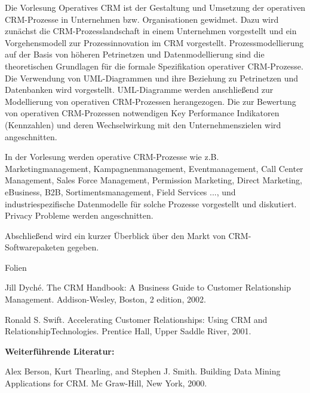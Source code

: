 \begin{course}
\begin{content}
Die Vorlesung Operatives CRM ist der Gestaltung und Umsetzung der operativen CRM-Prozesse in Unternehmen bzw. Organisationen gewidmet. Dazu wird zunächst die CRM-Prozesslandschaft in einem Unternehmen vorgestellt und ein Vorgehensmodell zur Prozessinnovation im CRM vorgestellt. Prozessmodellierung auf der Basis von höheren Petrinetzen und Datenmodellierung sind die theoretischen Grundlagen für die formale Spezifikation operativer CRM-Prozesse. Die Verwendung von UML-Diagrammen und ihre Beziehung zu Petrinetzen und Datenbanken wird vorgestellt. UML-Diagramme werden anschließend zur Modellierung von operativen CRM-Prozessen herangezogen. Die zur Bewertung von operativen CRM-Prozessen notwendigen Key Performance Indikatoren (Kennzahlen) und deren Wechselwirkung mit den Unternehmenszielen wird angeschnitten.

 

In der Vorlesung werden operative CRM-Prozesse wie z.B. Marketingmanagement, Kampagnenmanagement, Eventmanagement, Call Center Management, Sales Force Management, Permission Marketing, Direct Marketing, eBusiness, B2B, Sortimentsmanagement, Field Services ..., und industriespezifische Datenmodelle für solche Prozesse vorgestellt und diskutiert. Privacy Probleme werden angeschnitten.

 

Abschließend wird ein kurzer Überblick über den Markt von CRM-Softwarepaketen gegeben.


\end{content}

\begin{media}Folien

\end{media}

\begin{literature} 

Jill Dyché. The CRM Handbook: A Business Guide to Customer Relationship Management. Addison-Wesley, Boston, 2 edition, 2002.

  

Ronald S. Swift. Accelerating Customer Relationships: Using CRM and RelationshipTechnologies. Prentice Hall, Upper Saddle River, 2001.

 

\textbf{Weiterführende Literatur:}

  

Alex Berson, Kurt Thearling, and Stephen J. Smith. Building Data Mining Applications for CRM. Mc Graw-Hill, New York, 2000.


\end{literature}
\end{course}
